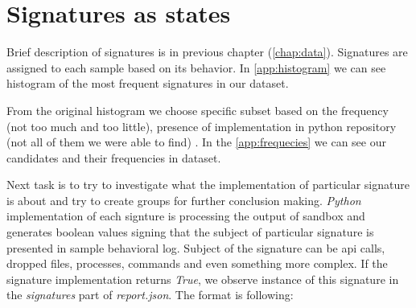 \section{Signatures as states}
Brief description of signatures is in previous chapter (\ref{chap:data}). Signatures are assigned to each sample based on its behavior. In \ref{app:histogram} we can see histogram of the most frequent signatures in our dataset. 

From the original histogram we choose specific subset based on the frequency (not too much and too little), presence of implementation in python repository (not all of them we were able to find) . In the \ref{app:frequecies} we can see our candidates and their frequencies in dataset.

Next task is to try to investigate what the implementation of particular signature is about and try to create groups for further conclusion making. \emph{Python} implementation of each signture is processing the output of sandbox and generates boolean values signing that the subject of particular signature is presented in sample behavioral log. Subject of the signature can be api calls, dropped files, processes, commands and even something more complex. If the signature implementation returns \emph{True}, we observe instance of this signature in the \emph{signatures} part of \emph{report.json}. The format is following: 

